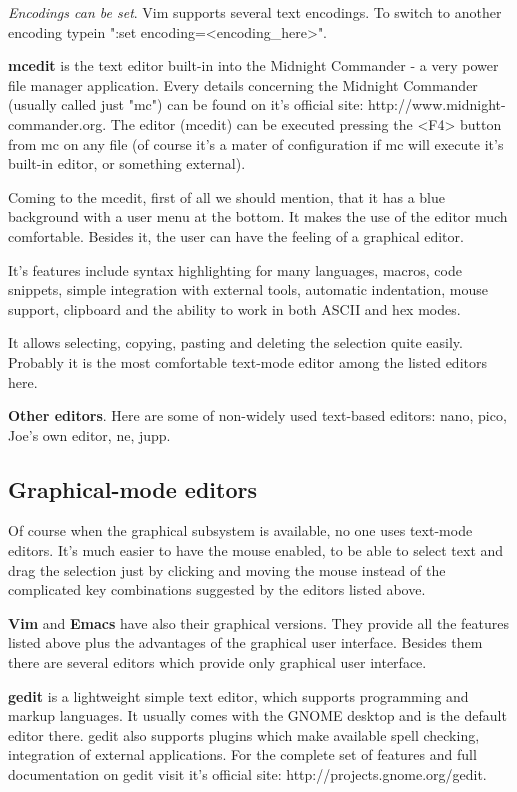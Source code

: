 \textit {Encodings can be set}. Vim supports several text encodings. To switch to another encoding typein ":set encoding=<encoding\_here>". 

\textbf {mcedit} is the text editor built-in into the Midnight Commander - a very power file manager application. Every details concerning the Midnight Commander (usually called just "mc") can be found on it's official site: http://www.midnight-commander.org. The editor (mcedit) can be executed pressing the <F4> button from mc on any file (of course it's a mater of configuration if mc will execute it's built-in editor, or something external).

Coming to the mcedit, first of all we should mention, that it has a blue background with a user menu at the bottom. It makes the use of the editor much comfortable. Besides it, the user can have the feeling of a graphical editor.

It's features include syntax highlighting for many languages, macros, code snippets, simple integration with external tools, automatic indentation, mouse support, clipboard and the ability to work in both ASCII and hex modes.

It allows selecting, copying, pasting and deleting the selection quite easily. Probably it is the most comfortable text-mode editor among the listed editors here.

\textbf {Other editors}. Here are some of non-widely used text-based editors: nano, pico, Joe's own editor, ne, jupp.

\subsection{Graphical-mode editors}
Of course when the graphical subsystem is available, no one uses text-mode editors. It's much easier to have the mouse enabled, to be able to select text and drag the selection just by clicking and moving the mouse instead of the complicated key combinations suggested by the editors listed above.

\textbf{Vim} and \textbf{Emacs} have also their graphical versions. They provide all the features listed above plus the advantages of the graphical user interface. Besides them there are several editors which provide only graphical user interface.

\textbf{gedit} is a lightweight simple text editor, which supports programming and markup languages. It usually comes with the GNOME desktop and is the default editor there. gedit also supports plugins which make available spell checking, integration of external applications. For the complete set of features and full documentation on gedit visit it's official site: http://projects.gnome.org/gedit.


